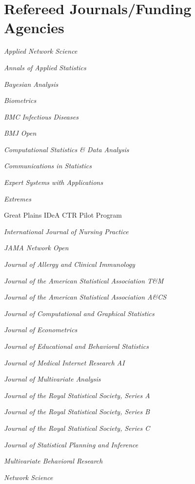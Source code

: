\documentclass[11pt]{article}
\begin{document}
\section{Refereed Journals/Funding Agencies}
\begin{description}
\setlength\itemsep{0pc}
\item {\it Applied Network Science}
\item {\it Annals of Applied Statistics}
\item {\it Bayesian Analysis}
\item {\it Biometrics}
\item {\it BMC Infectious Diseases} %
\item {\it BMJ Open} %
\item {\it Computational Statistics \& Data Analysis}
\item {\it Communications in Statistics}
\item {\it Expert Systems with Applications}
\item {\it Extremes}
\item Great Plains IDeA CTR Pilot Program
\item \textit{ International Journal of Nursing Practice}
\item {\it JAMA Network Open}
\item {\it Journal of Allergy and Clinical Immunology}
\item {\it Journal of the American Statistical Association T\&M}
\item {\it Journal of the American Statistical Association A\&CS}
\item {\it Journal of Computational and Graphical Statistics}
\item {\it Journal of Econometrics}
\item {\it Journal of Educational and Behavioral Statistics}
\item {\it Journal of Medical Internet Research AI}
\item {\it Journal of Multivariate Analysis}
\item {\it Journal of the Royal Statistical Society, Series A}
\item {\it Journal of the Royal Statistical Society, Series B}
\item {\it Journal of the Royal Statistical Society, Series C}
\item {\it Journal of Statistical Planning and Inference}
\item {\it Multivariate Behavioral Research}
\item {\it Network Science}

\end{description}
\end{document}
